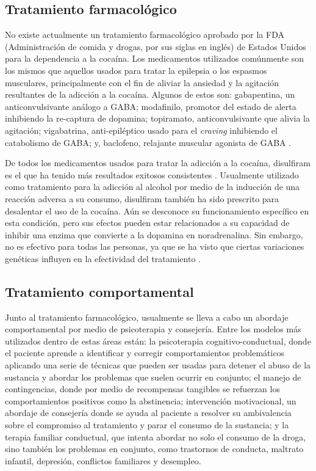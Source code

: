 \subsection{Tratamiento farmacológico}
No existe actualmente un tratamiento farmacológico aprobado por la FDA (Administración de comida y drogas, por sus siglas en inglés) de Estados Unidos para la dependencia a la cocaína.
Los medicamentos utilizados comúnmente son los mismos que aquellos usados para tratar la epilepsia o los espasmos musculares, principalmente con el fin de aliviar la ansiedad y la agitación resultantes de la adicción a la cocaína.
Algunos de estos son: gabapentina, un anticonvulsivante análogo a GABA; modafinilo, promotor del estado de alerta inhibiendo la re-captura de dopamina; topiramato, anticonvulsivante que alivia la agitación; vigabatrina, anti-epiléptico usado para el \textit{craving} inhibiendo el catabolismo de GABA; y, baclofeno, relajante muscular agonista de GABA \parencite{Volkow2007b}.\par
De todos los medicamentos usados para tratar la adicción a la cocaína, disulfiram es el que ha tenido más resultados exitosos consistentes \parencite{Volkow2007b}.
Usualmente utilizado como tratamiento para la adicción al alcohol por medio de la inducción de una reacción adversa a su consumo, disulfiram también ha sido prescrito para desalentar el uso de la cocaína.
Aún se desconoce su funcionamiento específico en esta condición, pero sus efectos pueden estar relacionados a su capacidad de inhibir una enzima que convierte a la dopamina en noradrenalina.
Sin embargo, no es efectivo para todas las personas, ya que se ha visto que ciertas variaciones genéticas influyen en la efectividad del tratamiento \parencite{Gaval-Cruz2009a, Volkow2007b}.

\subsection{Tratamiento comportamental}
Junto al tratamiento farmacológico, usualmente se lleva a cabo un abordaje comportamental por medio de psicoterapia y consejería.
Entre los modelos más utilizados \parencite{Volkow2008} dentro de estas áreas están:
la psicoterapia cognitivo-conductual, donde el paciente aprende a identificar y corregir comportamientos problemáticos aplicando una serie de técnicas que pueden ser usadas para detener el abuso de la sustancia y abordar los problemas que suelen ocurrir en conjunto;
el manejo de contingencias, donde por medio de recompensas tangibles se refuerzan los comportamientos positivos como la abstinencia;
intervención motivacional, un abordaje de consejería donde se ayuda al paciente a resolver su ambivalencia sobre el compromiso al tratamiento y parar el consumo de la sustancia;
y la terapia familiar conductual, que intenta abordar no solo el consumo de la droga, sino también los problemas en conjunto, como trastornos de conducta, maltrato infantil, depresión, conflictos familiares y desempleo.

